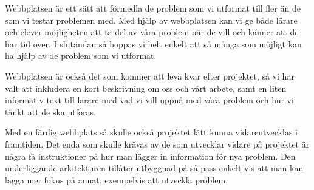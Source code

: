 \textcolor{Mahogany}{Webbplatsen är ett sätt att förmedla de problem som vi utformat till fler än de som vi testar problemen med. Med hjälp av webbplatsen kan vi ge både lärare och elever möjligheten att ta del av våra problem när de vill och känner att de har tid över.
I slutändan så hoppas vi helt enkelt att så många som möjligt kan ha hjälp av de problem som vi utformat.}

\textcolor{Mahogany}{Webbplatsen är också det som kommer att leva kvar efter projektet, så vi har valt att inkludera en kort beskrivning om oss och vårt arbete, samt en liten informativ text till lärare med vad vi vill uppnå med våra problem och hur vi tänkt att de ska utföras.}

\textcolor{WildStrawberry}{
    Med en färdig webbplats så skulle också projektet lätt kunna vidareutvecklas i framtiden. Det enda som skulle krävas av de som utvecklar vidare på projektet är några få instruktioner på hur man lägger in information för nya problem. Den underliggande arkitekturen tillåter utbyggnad på så pass enkelt vis att man kan lägga mer fokus på annat, exempelvis att utveckla problem.
    }
